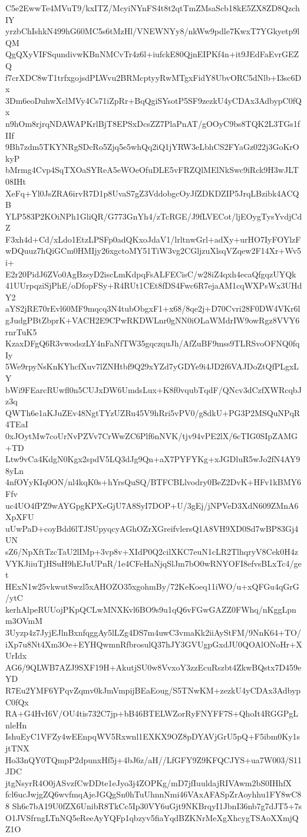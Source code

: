 C5e2EwwTe4MVuT9/kxITZ/McyiNYnFS4t8t2qtTmZMsaScb18kE5ZX8ZD8QzchIY
yrzbChIshkN499hG60MC5s6tMzHl/VNEWNYy8/nkWw9pdle7KwxT7YGkyetp9lQM
QgQXyVIFSqundivwKBnNMCvTr4z6l+iufckE80QjnEIPKf4n+it9JEdFaEvrGEZQ
f7crXDC8wT1trfxgojsdPLWvu2BRMcptyyRwMTgxFidY8UbvORC5dNlb+I3sc6Dx
3Dm6eoDuhwXclMVy4Cs71iZpRr+BqQgiSYsotP5SF9zezkU4yCDAx3AdbypC0fQx
n9hOm8rjrqNDAWAPKrlBjT8EPSxDcsZZ7PlaPnAT/gOOyC9bs8TQK2L3TGs1fIIf
9Bh7zdm5TKYNRgSDcRo5Zjq5e5whQq2iQ1jYRW3eLbhCS2FYaGz022j3GoKrOkyP
bMrmg4Cvp4SqTXOaSYReA5eWOeOfuDLE5vFRZQlMElNkSwc9iRck9H3wJLT08IHt
XeFq+Yl0JsZRA6irvR7D1p8UvaS7gZ3VddobgcOyJfZDKDZIP5JrqLBzibk4ACQB
YLP583P2KOiNPh1GliQR/G773GnYh4/zTcRGE/J9fLVECot/ljEOygTysYvdjCdZ
F3xh4d+Cd/xLdo1EtzLPSFp0adQKxoJdaV1/lrltnwGrl+adXy+urHO7IyFOYlzF
wDQuuz7hQiGCm0HMIjy26xgctoMY51TiW3vg2CGljzuXlsqVZqew2F14Xr+Wv5i+
E2r20PidJ6ZVo0AgBzsyD2iscLmKdpqFsALFECisC/w28iZ4qxh4ecaQfgqzUYQk
41UUrpqziSjPhE/oDfopFSy+R4RUt1CEt8fDS4Fwc6R7ejaAM1cqWXPsWx3UHdY2
aYS2jRE70rEvl60MF9mqcq3N4tubObgxF1+x68/8qe2j+D70Cvri28F0DW4VKr6l
gJudgPBtZbprK+VACH2E9CPwRKDWLnr0gNN0iOLaWMdrIW9owRgz8VVY6rnrTuK5
KzaxDFgQ6R3vwodszLY4nFaNfTW35gqczquJh/AfZuBF9mss9TLRSvoOFNQ0fqIy
5We9rpyNsKnKYhcfXuv7lZNHtbf9Q29xYZd7yGDYe9i4JD2f6VAJDoZtQfPLgxLY
bWi9FEarcRUwfl0n5CUJxDW6UmdsLux+K8f0vqubTqdF/QNcv3dCzfXWRcqbJz3q
QWTh6e1aKJuZEv48NgtTYzUZRu45V9hRri5vPV0/g8dkU+PG3P2MSQuNPqR4TEaI
0xJOytMw7coUrNvPZVv7CrWwZC6Plf6nNVK/tjv94vPE2lX/6cTIG0SIpZAMG+TD
Ltw9vCa4KdgN0Kgx2spdV5LQ3dJg9Qn+aX7PYFYKg+xJGDluR5wJo2fN4AY98yLn
4nfOYyKIq0ON/nl4kqK0s+hYrsQuSQ/BTFCBLlvodry0BeZ2DvK+HFv1kBMY6Ffv
uc4UO4fPZ9wAYGpgKPXeGjU7A8SyI7DOP+U/3gEj/jNPVeD3XdN609ZMnA6XpXFU
uUwPaD+coyBdd6lTJSUpyqcyAGhOZrXGreifvlersQ1A8VH9XD0Sd7wBP83Gj4UN
sZ6/NpXftTzcTaU2lIMp+3vp8v+XIdP0Q2cilXKC7euN1cLR2TlhqryV8Cek0H4z
VYKJiiuTjHSuH9hEJuUPnR/1e4CFeHaNjqSlJm7bO0wRNYOFI8efvsBLxTc4/get
HExN1w25vkwutSwzl5xAHOZO35xgohmBy/72KeKoeq11iWO/u+xQFGu4qGrG/ytC
kerhAlpeRUUojPKpQCLwMNXKvl6BO9s9u1qQ6vFGwGAZZ0FWhq/nKggLpnm3OVmM
3Uyzp4z7JyjEJlnBxnfqggAy5lLZg4DS7m4uwC3vmaKk2iiAyStFM/9NnK64+TO/
iXp7u8Nt4Xm3Oe+EYHQwmnRfbrosulQ37hJY3GVUgpGxdJU0QOAlONoHr+XUrIdx
AG6/9QLWB7AZJ9SXF19H+AkutjSU0w8VvxoY3zzEcuRszbt4ZkwBQstx7D459eYD
R7Eu2YMF6YPqvZqmv0kJmVmpijBEaEoug/S5TNwKM+zezkU4yCDAx3AdbypC0fQx
RA+G4HvI6V/OU4tis732C7jp+bB46BTELWZorRyFNYFF7S+QhoIt4RGGPgLnleHn
IshuEyC1VFZy4wEEnpqWV5Rxwnl1EXKX9OZ8pDYAVjGrU5pQ+F5ibm0Ky1sjtTNX
Ho33nQY0TQmpP2dpunxHf5j+4bJ6z/aH//LfGFY9Z9KFQCJYS+ua7W003/S11JDC
jtgNsyrR4O0jASvzfCwDDte1eJyo3j4ZOPKg/mD7jfIuuldajRIVAwm2bS0IHhfX
fcl6ucJwjgZQ6wvfmqAjeJGQgSn0hTuUhnnNmi46VAxAFASpZrAoyhhu1FY8wC88
Sh6c7bA19U0fZX6UnibR8TkCc5Ip30VY6uGjt9NKBrqyI1JbnI36nb7g7dJT5+7s
O1JVSfrngLTnNQ5eReeAyYQFp1qbzyv5fiaYqdBZKNrMeXgXhcygTSAoXXmjQZ1O
